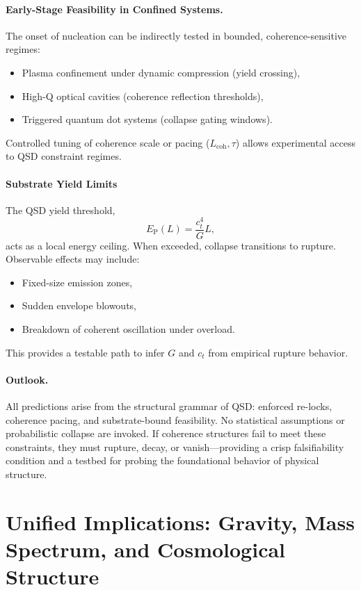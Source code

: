 \documentclass[preprints,article,submit,pdftex,moreauthors]{Definitions/mdpi}
\begin{document}
\paragraph{Early-Stage Feasibility in Confined Systems.}
The onset of nucleation can be indirectly tested in bounded, coherence-sensitive regimes:
\begin{itemize}
  \item Plasma confinement under dynamic compression (yield crossing),
  \item High-Q optical cavities (coherence reflection thresholds),
  \item Triggered quantum dot systems (collapse gating windows).
\end{itemize}
Controlled tuning of coherence scale or pacing (\(L_{\mathrm{coh}}, \tau\)) allows experimental access to QSD constraint regimes.

\paragraph{Substrate Yield Limits}
The QSD yield threshold,
\[
E_{\mathrm{P}}(L) = \frac{c_t^4}{G} L,
\]
acts as a local energy ceiling. When exceeded, collapse transitions to rupture. Observable effects may include:
\begin{itemize}
  \item Fixed-size emission zones,
  \item Sudden envelope blowouts,
  \item Breakdown of coherent oscillation under overload.
\end{itemize}
This provides a testable path to infer \( G \) and \( c_t \) from empirical rupture behavior.

\paragraph{Outlook.}
All predictions arise from the structural grammar of QSD: enforced re-locks, coherence pacing, and substrate-bound feasibility. No statistical assumptions or probabilistic collapse are invoked. If coherence structures fail to meet these constraints, they must rupture, decay, or vanish—providing a crisp falsifiability condition and a testbed for probing the foundational behavior of physical structure.


\section[\appendixname~\thesection]{Unified Implications: Gravity, Mass Spectrum, and Cosmological Structure}
\label{app:unified}
\end{document}

